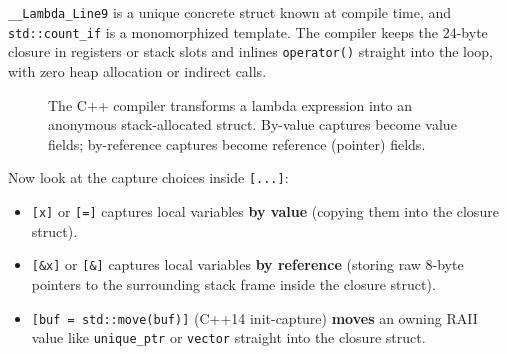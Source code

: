 \texttt{\_\_Lambda\_Line9} is a unique concrete struct known at compile time, and \texttt{std::count\_if} is a monomorphized template. The compiler keeps the 24-byte closure in registers or stack slots and inlines \texttt{operator()} straight into the loop, with zero heap allocation or indirect calls.

\begin{figure}[htbp]
\centering
{}
\caption{The C++ compiler transforms a lambda expression into an anonymous stack-allocated struct. By-value captures become value fields; by-reference captures become reference (pointer) fields.}
\label{fig:lambda-desugaring}
\end{figure}


Now look at the capture choices inside \texttt{[...]}:
\begin{itemize}
  \item \texttt{[x]} or \texttt{[=]} captures local variables \textbf{by value} (copying them into the closure struct).
  \item \texttt{[\&x]} or \texttt{[\&]} captures local variables \textbf{by reference} (storing raw 8-byte pointers to the surrounding stack frame inside the closure struct).
  \item \texttt{[buf = std::move(buf)]} (C++14 init-capture) \textbf{moves} an owning RAII value like \texttt{unique\_ptr} or \texttt{vector} straight into the closure struct.
\end{itemize}

